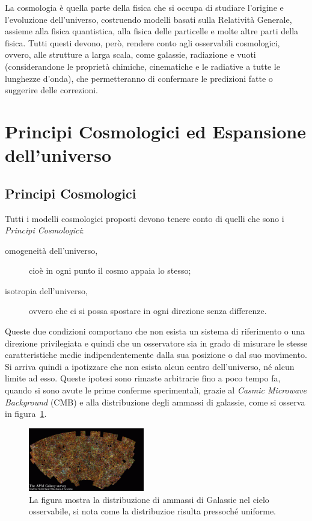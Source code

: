 La cosmologia è quella parte della fisica che si occupa di studiare l'origine e l'evoluzione dell'universo, costruendo modelli basati sulla Relatività Generale, assieme alla fisica quantistica, alla fisica delle particelle e molte altre parti della fisica. Tutti questi devono, però, rendere conto agli osservabili cosmologici, ovvero, alle strutture a larga scala, come galassie, radiazione e vuoti (considerandone le proprietà chimiche, cinematiche e le radiative a tutte le lunghezze d'onda), che permetteranno di confermare le predizioni fatte o suggerire delle correzioni.
\section{Principi Cosmologici ed Espansione dell'universo}\label{sec:principi-espansione}
\subsection{Principi Cosmologici}\label{sec:principi-cosmologici}

Tutti i modelli cosmologici proposti devono tenere conto di quelli che sono i \textit{Principi Cosmologici}:
\begin{description}
    \item[omogeneità dell'universo,]cioè in ogni punto il cosmo appaia lo stesso;
    \item[isotropia dell'universo,]ovvero che ci si possa spostare in ogni direzione senza differenze.
\end{description}
Queste due condizioni comportano che non esista un sistema di riferimento o una direzione privilegiata e quindi che un osservatore sia in grado di misurare le stesse caratteristiche medie indipendentemente dalla sua posizione o dal suo movimento. Si arriva quindi a ipotizzare che non esista alcun centro dell'universo, né alcun limite ad esso. Queste ipotesi sono rimaste arbitrarie fino a poco tempo fa, quando si sono avute le prime conferme sperimentali, grazie al \textit{Casmic Microwave Background} (CMB) e alla distribuzione degli ammassi di galassie, come si osserva in figura~\ref{fig:APM}.
\begin{figure}
    \centering
    \includegraphics[width=0.45\textwidth]{immagini/APM.png}
    \caption{La figura mostra la distribuzione di ammassi di Galassie nel cielo osservabile, si nota come la distribuzioe risulta pressoché uniforme.}\label{fig:APM}
\end{figure}
